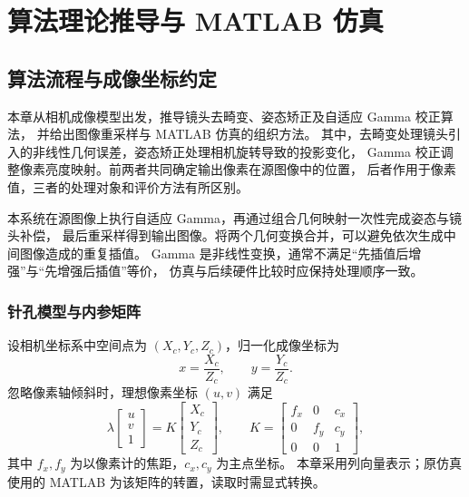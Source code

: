 \chapter{算法理论推导与 MATLAB 仿真}
\label{chap:algorithm}

\section{算法流程与成像坐标约定}
本章从相机成像模型出发，推导镜头去畸变、姿态矫正及自适应 Gamma 校正算法，
并给出图像重采样与 MATLAB 仿真的组织方法。
其中，去畸变处理镜头引入的非线性几何误差，姿态矫正处理相机旋转导致的投影变化，
Gamma 校正调整像素亮度映射。前两者共同确定输出像素在源图像中的位置，
后者作用于像素值，三者的处理对象和评价方法有所区别。

本系统在源图像上执行自适应 Gamma，再通过组合几何映射一次性完成姿态与镜头补偿，
最后重采样得到输出图像。将两个几何变换合并，可以避免依次生成中间图像造成的重复插值。
Gamma 是非线性变换，通常不满足“先插值后增强”与“先增强后插值”等价，
仿真与后续硬件比较时应保持处理顺序一致。

\subsection{针孔模型与内参矩阵}
设相机坐标系中空间点为 $(X_c,Y_c,Z_c)$，归一化成像坐标为
\begin{equation}
x=\frac{X_c}{Z_c},\qquad y=\frac{Y_c}{Z_c}.
\end{equation}
忽略像素轴倾斜时，理想像素坐标 $(u,v)$ 满足
\begin{equation}
\lambda\begin{bmatrix}u\\v\\1\end{bmatrix}
=K\begin{bmatrix}X_c\\Y_c\\Z_c\end{bmatrix},\qquad
K=\begin{bmatrix}f_x&0&c_x\\0&f_y&c_y\\0&0&1\end{bmatrix},
\label{eq:camera-intrinsics}
\end{equation}
其中 $f_x,f_y$ 为以像素计的焦距，$c_x,c_y$ 为主点坐标。
本章采用列向量表示；原仿真使用的 MATLAB 
为该矩阵的转置，读取时需显式转换。

